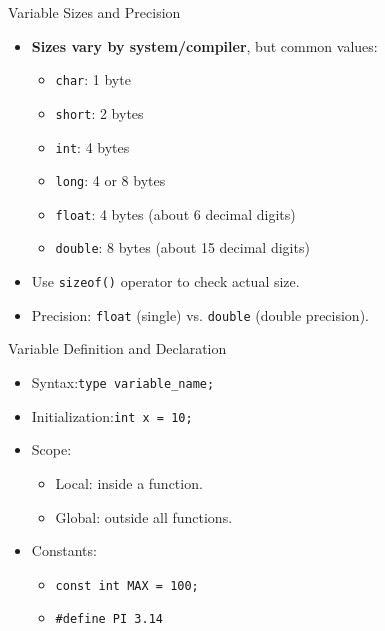 \documentclass[12pt, aspectratio=169]{beamer}
\begin{document}
    \begin{frame}{Variable Sizes and Precision}
        \begin{itemize}
            \item \textbf{Sizes vary by system/compiler}, but common values:
                \begin{itemize}
                    \item \texttt{char}: 1 byte
                    \item \texttt{short}: 2 bytes
                    \item \texttt{int}: 4 bytes
                    \item \texttt{long}: 4 or 8 bytes
                    \item \texttt{float}: 4 bytes (about 6 decimal digits)
                    \item \texttt{double}: 8 bytes (about 15 decimal digits)
                \end{itemize}
            \item Use \texttt{sizeof()} operator to check actual size.
            \item Precision: \texttt{float} (single) vs. \texttt{double} (double precision).
        \end{itemize}
    \end{frame}


    \begin{frame}{Variable Definition and Declaration}
        \begin{itemize}
            \item Syntax:\texttt{type variable\_name;}
            \item Initialization:\texttt{int x = 10;}
            \item Scope:
                \begin{itemize}
                    \item Local: inside a function.
                    \item Global: outside all functions.
                \end{itemize}
            \item Constants:
                \begin{itemize}
                    \item \texttt{const int MAX = 100;}
                    \item \texttt{\#define PI 3.14}
                \end{itemize}
        \end{itemize}
    \end{frame}
\end{document}
